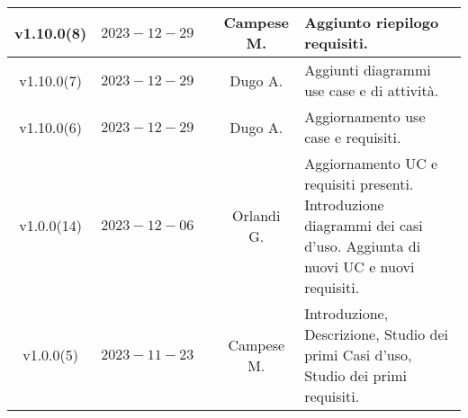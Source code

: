 {\begin{xltabular}{\textwidth}{c|c|c|c|X}
v1.10.0(8) & $2023-12-29$ &  & Campese M. & Aggiunto riepilogo requisiti.\\
\hline
v1.10.0(7) & $2023-12-29$ &  & Dugo A. & Aggiunti diagrammi use case e di attività.\\
\hline
v1.10.0(6) & $2023-12-29$ &  & Dugo A. & Aggiornamento use case e requisiti.\\
\hline
v1.0.0(14) & $2023-12-06$ &  & Orlandi G. & Aggiornamento UC e requisiti presenti. Introduzione diagrammi dei casi d'uso. Aggiunta di nuovi UC e nuovi requisiti.\\
\hline
v1.0.0(5) & $2023-11-23$ &  & Campese M. & Introduzione, Descrizione, Studio dei primi Casi d'uso, Studio dei primi requisiti.\\

    
\end{xltabular}}